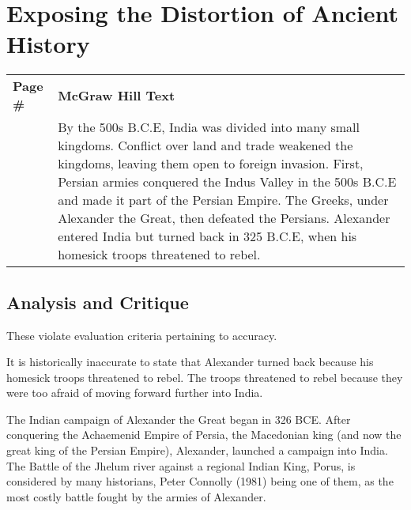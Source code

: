 \chapter[Exposing the Distortion of\\ Ancient History]{Exposing the Distortion of Ancient History}

\begin{longtable}{|>{\raggedleft}p{1.5cm}|p{8.5cm}|}
\multicolumn{2}{c}{\textbf{Table: 1}}\\ 
\hline
\textbf{Page \#} & \textbf{McGraw Hill Text} \tabularnewline
\hline 
270 & By the 500s B.C.E, India was divided into many small kingdoms. Conflict over land and trade weakened the kingdoms, leaving them open to foreign invasion. First, Persian armies conquered the Indus Valley in the 500s B.C.E and made it part of the Persian Empire. The Greeks, under Alexander the Great, then defeated the Persians. Alexander entered India but turned back in 325 B.C.E, when his homesick troops threatened to rebel. \tabularnewline
\hline
\end{longtable}

\section*{Analysis and Critique} 

These violate evaluation criteria pertaining to accuracy.

It is historically inaccurate to state that Alexander turned back because his homesick troops threatened to rebel. The troops threatened to rebel because they were too afraid of moving forward further into India.

The Indian campaign of Alexander the Great began in 326 BCE. After conquering the Achaemenid Empire of Persia, the Macedonian king (and now the great king of the Persian Empire), Alexander, launched a campaign into India. The Battle of the Jhelum river against a regional Indian King, Porus, is considered by many historians, Peter Connolly (1981) being one of them, as the most costly battle fought by the armies of Alexander.

